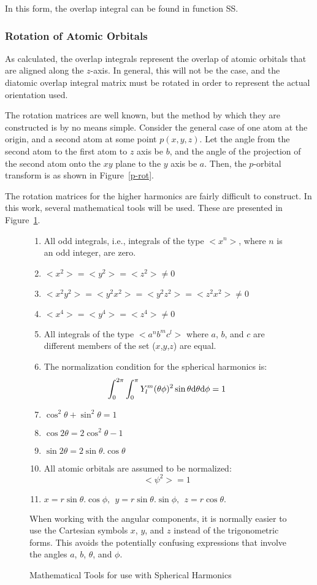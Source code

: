 In this form, the overlap integral can be found in function SS.

\subsubsection{Rotation of Atomic Orbitals}
As calculated, the overlap integrals represent the overlap of atomic
orbitals that are aligned along the $z$-axis.  In general, this will not
be the case, and the diatomic overlap integral matrix must be rotated in
order to represent the actual orientation used.

The rotation matrices are well known, but the method by which they are
constructed is by no means simple.  Consider the general case of one atom at
the origin, and a second atom at some point $p(x,y,z)$.
Let the angle from the
second atom to the first atom to $z$ axis be $b$, and the angle of the projection
of the second atom onto the $xy$ plane to the $y$ axis be $a$.  Then, the $p$-orbital
transform is as shown in Figure~\ref{p-rot}.

The rotation matrices for the higher harmonics are fairly difficult to construct.
In this work, several mathematical tools will be used.  These are presented in
Figure~\ref{maths}.

\begin{figure}
\begin{makeimage}
\end{makeimage}
\begin{enumerate}
\item All odd integrals, i.e., integrals of the type $<\!x^n\!>$, where $n$
is an odd integer, are zero.
\item $<\!x^2\!>=<\!y^2\!>=<\!z^2\!> \neq 0$
\item $<\!x^2y^2\!>=<\!y^2x^2\!>=<\!y^2z^2\!>=<\!z^2x^2\!>\neq 0$
\item $<\!x^4\!>=<\!y^4\!>=<\!z^4\!>\neq 0$
\item All integrals of the type $<\!a^nb^mc^l\!>$ where $a$, $b$, and $c$
are different members of the set ($x$,$y$,$z$) are equal.
\item The normalization condition for the spherical harmonics is:
$$
\int_0^{2\pi}\int_0^{\pi}Y_l^m(\theta\phi)^2\sin\theta {\rm d}\theta{\rm d}\phi =1
$$
\item $\cos^2\theta+\sin^2\theta=1$
\item $\cos 2\theta = 2\cos^2\theta -1$
\item $\sin 2\theta = 2\sin\theta .\cos\theta$
\item All atomic orbitals are assumed to be normalized:
$$
<\!\psi^2\!>=1
$$
\item $x=r\sin\theta.\cos\phi,\ \ y=r\sin\theta.\sin\phi,\ \ z=r\cos\theta.$
\end{enumerate}

When working with the angular components, it is normally easier to use the
Cartesian symbols $x$, $y$, and $z$ instead of the trigonometric forms.  This
avoids the potentially confusing expressions that involve the angles $a$, $b$,
$\theta$, and $\phi$.

\caption{\label{maths} Mathematical Tools for use with Spherical Harmonics}
\end{figure}


